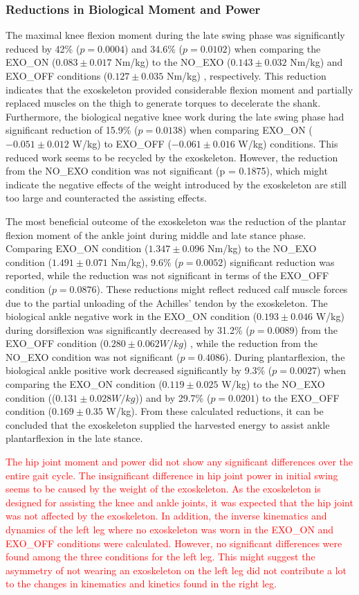 \documentclass[twocolumn,cleanfoot,10pt]{asme2ej}
\begin{document}
\subsubsection{Reductions in Biological Moment and Power}
The maximal knee flexion moment during the late swing phase was significantly reduced by 42\% ($p = 0.0004$) and 34.6\% ($p = 0.0102$) when comparing the EXO\_ON ($0.083\pm0.017$ Nm/kg) to the NO\_EXO ($0.143\pm0.032$ Nm/kg) and EXO\_OFF conditions ($0.127\pm0.035$ Nm/kg) , respectively.
This reduction indicates that the exoskeleton provided considerable flexion moment and partially replaced muscles on the thigh to generate torques to decelerate the shank.
Furthermore, the biological negative knee work during the late swing phase had significant reduction of 15.9\% ($p = 0.0138$) when comparing EXO\_ON ($-0.051\pm0.012$ W/kg) to EXO\_OFF ($-0.061\pm0.016$ W/kg) conditions.
This reduced work seems to be recycled by the exoskeleton. However, the reduction from the NO\_EXO condition was not significant (p = 0.1875), which might indicate the negative effects of the weight introduced by the exoskeleton are still too large and counteracted the assisting effects.

The most beneficial outcome of the exoskeleton was the reduction of the plantar flexion moment of the ankle joint during middle and late stance phase.
Comparing EXO\_ON condition ($1.347\pm0.096$ Nm/kg) to the NO\_EXO condition ($1.491\pm0.071$ Nm/kg), 9.6\% ($p = 0.0052$) significant reduction was reported, while the reduction was not significant in terms of the EXO\_OFF  condition ($p = 0.0876$).
These reductions might reflect reduced calf muscle forces due to the partial unloading of the Achilles’ tendon by the exoskeleton.
The biological ankle negative work in the EXO\_ON condition ($0.193\pm0.046$ W/kg) during dorsiflexion was significantly decreased by 31.2\% ($p = 0.0089$) from the EXO\_OFF condition ($0.280\pm0.062 W/kg$) , while the reduction from the NO\_EXO condition was not significant ($p = 0.4086$).
During plantarflexion, the biological ankle positive work decreased significantly by 9.3\% ($p = 0.0027$) when comparing the EXO\_ON condition ($0.119\pm0.025$ W/kg) to the NO\_EXO condition (($0.131\pm0.028 W/kg$)) and by 29.7\% ($p = 0.0201$) to the EXO\_OFF condition ($0.169\pm0.35$ W/kg).
From these calculated reductions, it can be concluded that the exoskeleton supplied the harvested energy to assist ankle plantarflexion in the late stance. 

\textcolor{red}{The hip joint moment and power did not show any significant differences over the entire gait cycle.
The insignificant difference in hip joint power in initial swing seems to be caused by the weight of the exoskeleton.
As the exoskeleton is designed for assisting the knee and ankle joints, it was expected that the hip joint was not affected by the exoskeleton.
In addition, the inverse kinematics and dynamics of the left leg where no exoskeleton was worn in the EXO\_ON and EXO\_OFF conditions were calculated.
However, no significant differences were found among the three conditions for the left leg.
This might suggest the asymmetry of not wearing an exoskeleton on the left leg did not contribute a lot to the changes in kinematics and kinetics found in the right leg.}
\end{document}
